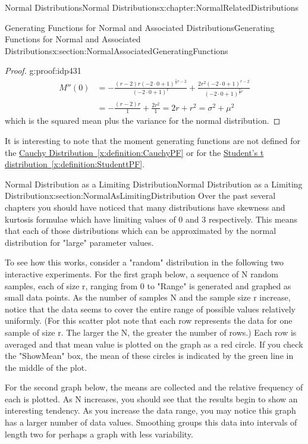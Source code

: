 \documentclass[oneside,10pt,]{book}
\newcommand{\xreffont}{\relax}
\numberwithin{equation}{section}
\begin{document}
\begin{chapterptx}{Normal Distributions}{}{Normal Distributions}{}{}{x:chapter:NormalRelatedDistributions}
\begin{sectionptx}{Generating Functions for Normal and Associated Distributions}{}{Generating Functions for Normal and Associated Distributions}{}{}{x:section:NormalAssociatedGeneratingFunctions}
\begin{proof}{}{g:proof:idp431}
\begin{align*}
M''(0) & = -\frac{{\left(r - 2\right)} r {\left(-2 \cdot 0 + 1\right)}^{\frac{1}{2} r - 2}}{{\left(-2 \cdot 0 + 1\right)}^{r}} + \frac{2 r^{2} {\left(-2 \cdot 0 + 1\right)}^{r - 2}}{{\left(-2 \cdot 0 + 1\right)}^{\frac{3}{2} r}} \\
& = -\frac{{\left(r - 2\right)} r }{1} + \frac{2 r^{2} }{1}= 2r + r^2 = \sigma^2 + \mu^2
\end{align*}
which is the squared mean plus the variance for the normal distribution.%
\end{proof}
%
\par
It is interesting to note that the moment generating functions are not defined for the \hyperref[x:definition:CauchyPF]{Cauchy Distribution~{\xreffont\ref{x:definition:CauchyPF}}} or for the \hyperref[x:definition:StudenttPF]{Student's t distribution~{\xreffont\ref{x:definition:StudenttPF}}}.%
\end{sectionptx}
%
%
\typeout{************************************************}
\typeout{************************************************}
%
\begin{sectionptx}{Normal Distribution as a Limiting Distribution}{}{Normal Distribution as a Limiting Distribution}{}{}{x:section:NormalAsLimitingDistribution}
Over the past several chapters you should have noticed that many distributions have skewness and kurtosis formulae which have limiting values of 0 and 3 respectively. This means that each of those distributions which can be approximated by the normal distribution for "large" parameter values.%
\par
To see how this works, consider a "random" distribution in the following two interactive experiments.  For the first graph below, a sequence of N random samples, each of size r, ranging from 0 to "Range" is generated and graphed as small data points.  As the number of samples N and the sample size r increase, notice that the data seems to cover the entire range of possible values relatively uniformly.  (For this scatter plot note that each row represents the data for one sample of size r.  The larger the N, the greater the number of rows.)  Each row is averaged and that mean value is plotted on the graph as a red circle.  If you check the "Show\textunderscore{}Mean" box, the mean of these circles is indicated by the green line in the middle of the plot.%
\par
For the second graph below, the means are collected and the relative frequency of each is plotted.  As N increases, you should see that the results begin to show an interesting tendency.   As you increase the data range, you may notice this graph has a larger number of data values.  Smoothing groups this data into intervals of length two for perhaps a graph with less variability.%

\end{sectionptx}
\end{chapterptx}
\end{document}
